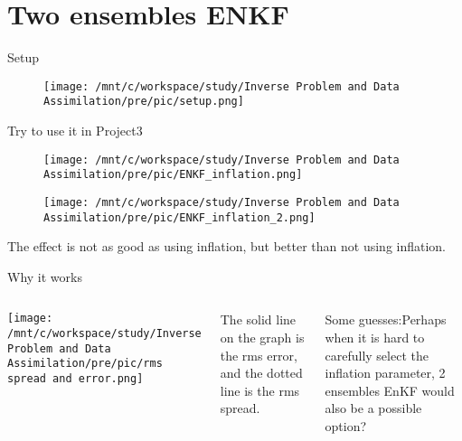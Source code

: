 \documentclass{beamer}
\begin{document}
\section{Two ensembles ENKF}
\begin{frame}{Setup}
    
    \begin{figure}[htbp]
        \centering
            \texttt{[image: /mnt/c/workspace/study/Inverse Problem and Data Assimilation/pre/pic/setup.png]} %
    \end{figure}
\end{frame}
\begin{frame}{Try to use it in Project3}
    \begin{figure}[htbp]
        \centering
        \begin{minipage}[t]{0.48\textwidth}
            \centering
            \texttt{[image: /mnt/c/workspace/study/Inverse Problem and Data Assimilation/pre/pic/ENKF\_inflation.png]}
        \end{minipage}
        \hfill
        \begin{minipage}[t]{0.48\textwidth}
            \centering
            \texttt{[image: /mnt/c/workspace/study/Inverse Problem and Data Assimilation/pre/pic/ENKF\_inflation\_2.png]} %

        \end{minipage}
    \end{figure}
    The effect is not as good as using inflation, but better than not using inflation.
\end{frame}
\begin{frame}{Why it works}
    \begin{columns}[c]
        \centering
        \texttt{[image: /mnt/c/workspace/study/Inverse Problem and Data Assimilation/pre/pic/rms spread and error.png]} %

        The solid line on the graph is the rms error, and the dotted line is the rms spread. 

        Some guesses:Perhaps when it is hard to carefully select the inflation parameter, 2 ensembles EnKF would also be a possible option?
    \end{columns}
\end{frame}
\end{document}

